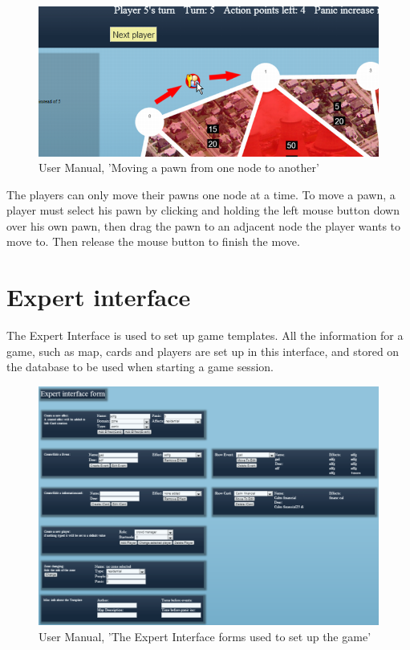 \begin{figure}[H]
  \centering
    \includegraphics[width=1.0\textwidth]{img/moving.png}
  \caption{User Manual, 'Moving a pawn from one node to another'}
  \label{fig:moving}
\end{figure}

The players can only move their pawns one node at a time. To move a pawn, a player must select his pawn by clicking and holding the left mouse button down over his own pawn, then drag the pawn to an adjacent node the player wants to move to. Then release the mouse button to finish the move.

\section{Expert interface}

The Expert Interface is used to set up game templates. All the information for a game, such as map, cards and players are set up in this interface, and stored on the database to be used when starting a game session.

\begin{figure}[H]
  \centering
    \includegraphics[width=1.0\textwidth]{img/ExpertInterfaceForms.png}
  \caption{User Manual, 'The Expert Interface forms used to set up the game'}
  \label{fig:expertinterface}
\end{figure}

